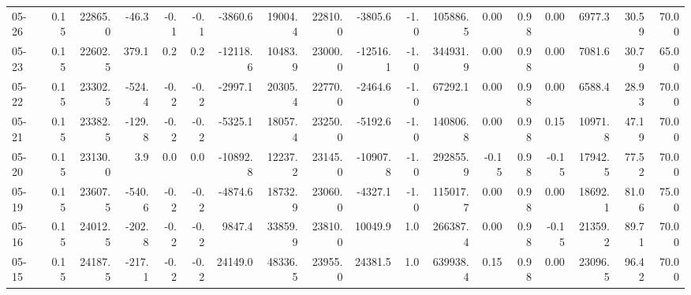 \begin{threeparttable}
{\begin{tabular}{lrrrrrrrrrrrrrrrrr}
  05-26 &     0.15 & 22865.0 &             -46.3 &              -0.1 &               -0.1 &            -3860.6 & 19004.4 & 22810.0 &    -3805.6 &                     -1.0 &            105886.5 &       0.00 &      0.98 &           0.00 &           6977.3 &           30.59 &                  70.00 \\
  05-23 &     0.15 & 22602.5 &             379.1 &               0.2 &                0.2 &           -12118.6 & 10483.9 & 23000.0 &   -12516.1 &                     -1.0 &            344931.9 &       0.00 &      0.98 &           0.00 &           7081.6 &           30.79 &                  65.00 \\
  05-22 &     0.15 & 23302.5 &            -524.4 &              -0.2 &               -0.2 &            -2997.1 & 20305.4 & 22770.0 &    -2464.6 &                     -1.0 &             67292.1 &       0.00 &      0.98 &           0.00 &           6588.4 &           28.93 &                  70.00 \\
  05-21 &     0.15 & 23382.5 &            -129.8 &              -0.2 &               -0.2 &            -5325.1 & 18057.4 & 23250.0 &    -5192.6 &                     -1.0 &            140806.8 &       0.00 &      0.98 &           0.15 &          10971.8 &           47.19 &                  70.00 \\
  05-20 &     0.15 & 23130.0 &               3.9 &               0.0 &                0.0 &           -10892.8 & 12237.2 & 23145.0 &   -10907.8 &                     -1.0 &            292855.9 &      -0.15 &      0.98 &          -0.15 &          17942.5 &           77.52 &                  70.00 \\
  05-19 &     0.15 & 23607.5 &            -540.6 &              -0.2 &               -0.2 &            -4874.6 & 18732.9 & 23060.0 &    -4327.1 &                     -1.0 &            115017.7 &       0.00 &      0.98 &           0.00 &          18692.1 &           81.06 &                  75.00 \\
  05-16 &     0.15 & 24012.5 &            -202.8 &              -0.2 &               -0.2 &             9847.4 & 33859.9 & 23810.0 &    10049.9 &                      1.0 &            266387.4 &       0.00 &      0.98 &          -0.15 &          21359.2 &           89.71 &                  70.00 \\
  05-15 &     0.15 & 24187.5 &            -217.1 &              -0.2 &               -0.2 &            24149.0 & 48336.5 & 23955.0 &    24381.5 &                      1.0 &            639938.4 &       0.15 &      0.98 &           0.00 &          23096.5 &           96.42 &                  70.00 \\

\end{tabular}}
\end{threeparttable}
